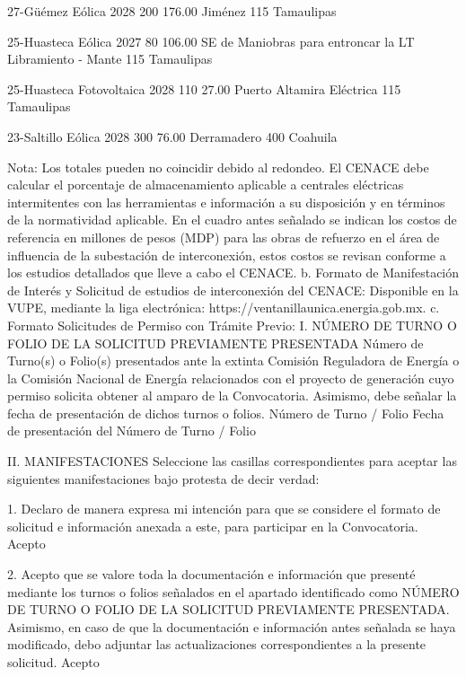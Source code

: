  
 27-Güémez
 Eólica
 2028
 200
 176.00
 Jiménez
 115
 Tamaulipas
 
 
 25-Huasteca
 Eólica
 2027
 80
 106.00
 SE de Maniobras para entroncar la LT Libramiento - Mante
 115
 Tamaulipas
 
 
 25-Huasteca
 Fotovoltaica
 2028
 110
 27.00
 Puerto Altamira Eléctrica
 115
 Tamaulipas
 
 
 23-Saltillo
 Eólica
 2028
 300
 76.00
 Derramadero
 400
 Coahuila
 
 Nota: Los totales pueden no coincidir debido al redondeo.
El CENACE debe calcular el porcentaje de almacenamiento aplicable a centrales eléctricas intermitentes con las herramientas e información a su disposición y en términos de la normatividad aplicable.
En el cuadro antes señalado se indican los costos de referencia en millones de pesos (MDP) para las obras de refuerzo en el área de influencia de la subestación de interconexión, estos costos se revisan conforme a los estudios detallados que lleve a cabo el CENACE.
b. Formato de Manifestación de Interés y Solicitud de estudios de interconexión del CENACE:
Disponible en la VUPE, mediante la liga electrónica: https://ventanillaunica.energia.gob.mx.
c. Formato Solicitudes de Permiso con Trámite Previo:
I.	NÚMERO DE TURNO O FOLIO DE LA SOLICITUD PREVIAMENTE PRESENTADA
Número de Turno(s) o Folio(s) presentados ante la extinta Comisión Reguladora de Energía o la Comisión Nacional de Energía relacionados con el proyecto de generación cuyo permiso solicita obtener al amparo de la Convocatoria. Asimismo, debe señalar la fecha de presentación de dichos turnos o folios. 
 Número de Turno / Folio
 Fecha de presentación del Número de Turno / Folio
 
 
 
 
 
 
II.	MANIFESTACIONES
Seleccione las casillas correspondientes para aceptar las siguientes manifestaciones bajo protesta de decir verdad:
 
 1.	Declaro de manera expresa mi intención para que se considere el formato de solicitud e información anexada a este, para participar en la Convocatoria.
  Acepto
 
 2.	Acepto que se valore toda la documentación e información que presenté mediante los turnos o folios señalados en el apartado identificado como NÚMERO DE TURNO O FOLIO DE LA SOLICITUD PREVIAMENTE PRESENTADA.
	Asimismo, en caso de que la documentación e información antes señalada se haya modificado, debo adjuntar las actualizaciones correspondientes a la presente solicitud. 
  Acepto
 
